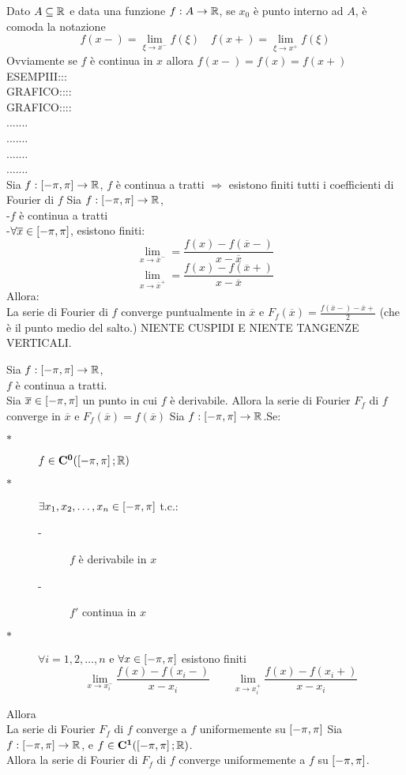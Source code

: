 \observation
Dato $A\subseteq \mathbb{R}$ e data una funzione $f:A \to \mathbb{R}$, se $x_0$ è punto interno ad $A$, è comoda la notazione
\[f(x-)=\lim\limits_{\xi\to x^{-}}f(\xi)\quad f(x+)=\lim\limits_{\xi\to x^{+}}f(\xi)\]
Ovviamente se $f$ è continua in $x$ allora $f(x-)=f(x)=f(x+)$
ESEMPIII:::\\
GRAFICO::::\\
GRAFICO::::\\
.......\\
.......\\
.......\\
.......\\
\proposition
Sia $f: \left[-\pi,\pi\right] \to \mathbb{R}$, $f$ è continua a tratti $\Rightarrow$ esistono finiti tutti i coefficienti di Fourier di $f$
\proposition
Sia $f: \left[-\pi,\pi\right] \to \mathbb{R}$,\\
-$f$ è continua a tratti\\
-$\forall \overline{x} \in\left[-\pi,\pi\right]$, esistono finiti:\\
\[ \lim\limits_{x\to\overline{x}^{-}}=\frac{f(x)-f(\overline{x}-)}{x-\overline{x}} \]
\[ \lim\limits_{x\to\overline{x}^{+}}=\frac{f(x)-f(\overline{x}+)}{x-\overline{x}} \]
Allora:\\
La serie di Fourier di $f$ converge puntualmente in $\overline{x}$ e $F_f(\overline{x})=\frac{f(\overline{x}-)-\overline{x}+}{2}$ (che è il punto medio del salto.)
\observation NIENTE CUSPIDI E NIENTE TANGENZE VERTICALI.

\corollary
Sia $f: \left[-\pi,\pi\right] \to \mathbb{R}$,\\
$f$ è continua a tratti.\\
Sia $\overline{x}\in\left[-\pi,\pi\right]$ un punto in cui $f$ è derivabile. Allora la serie di Fourier $F_f$ di $f$ converge in $\overline{x}$ e $F_f(\overline{x})=f(\overline{x})$
\proposition
Sia $f: \left[-\pi,\pi\right] \to \mathbb{R}$.Se:\\
\begin{description}
	\item[$\ast$] $f\in \mathbf{C^{0}}(\left[-\pi,\pi\right]; \mathbb{R})$
	\item[$\ast$] $\exists x_1,x_2,\dotsc,x_n\in\left[-\pi,\pi\right]$ t.c.:
	\begin{description}
		\item[-] $f$ è derivabile in $x$
		\item[-] $f'$ continua in $x$
	\end{description}
	\item[$\ast$] $\forall i=1,2,\dotsc,n$ e $\forall x\in\left[-\pi,\pi\right]$ esistono finiti
	\[\lim\limits_{x\to x_i^{-}}\frac{f(x)-f(x_i-)}{x-x_i}\qquad \lim\limits_{x\to x_i^{+}}\frac{f(x)-f(x_i+)}{x-x_i}\]

\end{description}
Allora\\
La serie di Fourier $F_f$ di $f$ converge a $f$ uniformemente su $\left[-\pi,\pi\right]$
\corollary
Sia $f: \left[-\pi,\pi\right] \to \mathbb{R}$, e $f\in \mathbf{C^{1}}(\left[-\pi,\pi\right]; \mathbb{R})$.\\
Allora la serie di Fourier di $F_f$ di $f$ converge uniformemente a $f$ su $\left[-\pi,\pi\right]$.